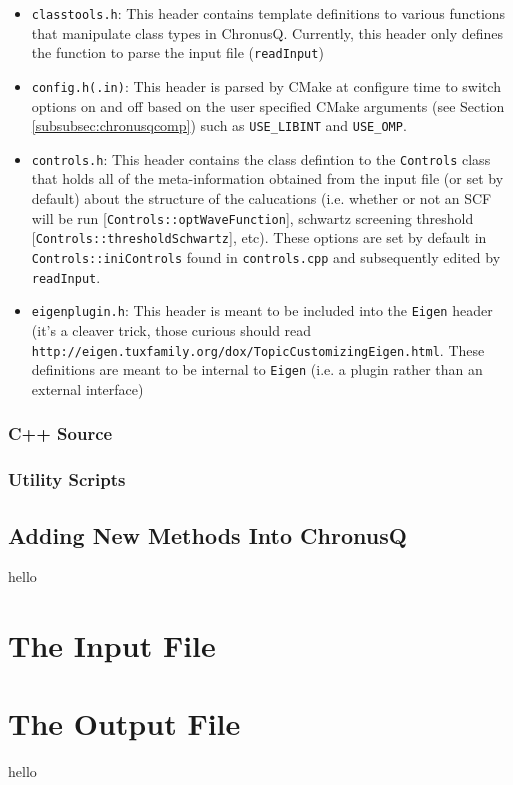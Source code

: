 \documentclass[12pt]{article}
\begin{document}
\begin{itemize}
\item \texttt{classtools.h}: This header contains template definitions to various functions that manipulate class types in ChronusQ. Currently, this header only defines the function to parse the input file (\texttt{readInput})

\item \texttt{config.h(.in)}: This header is parsed by CMake at configure time to switch options on and off based on the user specified CMake arguments (see Section \ref{subsubsec:chronusqcomp}) such as \texttt{USE\_LIBINT} and \texttt{USE\_OMP}.

\item \texttt{controls.h}: This header contains the class defintion to the \texttt{Controls} class that holds all of the meta-information obtained from the input file (or set by default) about the structure of the calucations (i.e. whether or not an SCF will be run [\texttt{Controls::optWaveFunction}], schwartz screening threshold [\texttt{Controls::thresholdSchwartz}], etc). These options are set by default in \texttt{Controls::iniControls} found in \texttt{controls.cpp} and subsequently edited by \texttt{readInput}.

\item \texttt{eigenplugin.h}: This header is meant to be included into the \texttt{Eigen} header (it's a cleaver trick, those curious should read \texttt{http://eigen.tuxfamily.org/dox/TopicCustomizingEigen.html}. These definitions are meant to be internal to \texttt{Eigen} (i.e. a plugin rather than an external interface)
\end{itemize}

\subsubsection{C++ Source}
\subsubsection{Utility Scripts}
\subsection{Adding New Methods Into ChronusQ}
hello
\section{The Input File}
\section{The Output File}
hello
\end{document}
